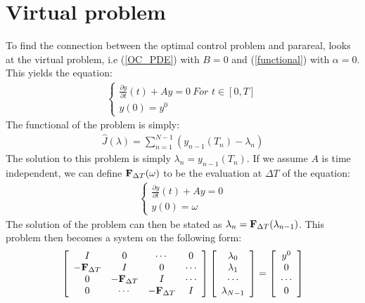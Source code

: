 \documentclass[11pt,a4paper]{article}
\begin{document}
\section{Virtual problem}
To find the connection between the optimal control problem and parareal, \cite{maday2002parareal} looks at the virtual problem, i.e (\ref{OC_PDE}) with $B=0$ and (\ref{functional}) with $\alpha=0$. This yields the equation:
\begin{align}
\left\{
     \begin{array}{lr}
		\frac{\partial y}{\partial t}(t)+Ay=0  \ \textit{For $t \in [0,T]$}\\
		y(0)=y^0
	\end{array}
\right. \label{viritual}
\end{align}
The functional of the problem is simply:
\begin{align}
\hat{J}(\lambda) = \sum_{n=1}^{N-1} (y_{n-1}(T_{n})-\lambda_{n}) \label{virtual_func}
\end{align}
The solution to this problem is simply $\lambda_n=y_{n-1}(T_n)$. If we assume $A$ is time independent, we can define $\bold{F}_{\Delta T}(\omega)$ to be the evaluation at $\Delta T$ of the equation:
\begin{align}
\left\{
     \begin{array}{lr}
		\frac{\partial y}{\partial t}(t)+Ay=0  \\
		y(0)=\omega
	\end{array} 
\right. \label{F_operator}
\end{align}
The solution of the problem can then be stated as $\lambda_n = \bold{F}_{\Delta T}(\lambda_{n-1})$. This problem then becomes a system on the following form:
\begin{align}
  \left[ \begin{array}{cccc}
   I & 0 & \cdots & 0 \\  
   -\bold{F}_{\Delta T} & I & 0 & \cdots \\ 
   0 &-\bold{F}_{\Delta T} & I  & \cdots \\
   0 &\cdots &-\bold{F}_{\Delta T} & I   \\
   \end{array}  \right] 
   \left[ \begin{array}{c}
   \lambda_0 \\
   \lambda_1 \\
   \cdots \\
   \lambda_{N-1} \\
   \end{array}  \right] =
   \left[ \begin{array}{c}
   y^0 \\
   0 \\
   \cdots \\
   0 \\
   \end{array}  \right]
\end{align}
\end{document}
